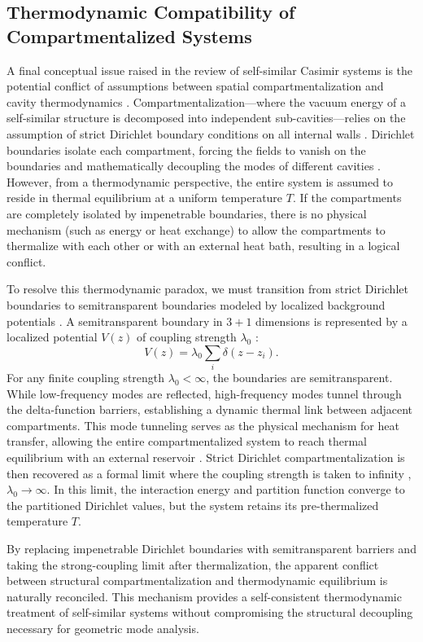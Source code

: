\documentclass[12pt,letterpaper]{article}
\newcommand{\revision}[1]{#1}
\begin{document}
\subsection{Thermodynamic Compatibility of Compartmentalized Systems}

\revision{A final conceptual issue raised in the review of self-similar Casimir systems is the potential conflict of assumptions between spatial compartmentalization and cavity thermodynamics \cite{shajesh2017}. Compartmentalization---where the vacuum energy of a self-similar structure is decomposed into independent sub-cavities---relies on the assumption of strict Dirichlet boundary conditions on all internal walls \cite{shajesh2017}. Dirichlet boundaries isolate each compartment, forcing the fields to vanish on the boundaries and mathematically decoupling the modes of different cavities \cite{shajesh2017}. However, from a thermodynamic perspective, the entire system is assumed to reside in thermal equilibrium at a uniform temperature $T$. If the compartments are completely isolated by impenetrable boundaries, there is no physical mechanism (such as energy or heat exchange) to allow the compartments to thermalize with each other or with an external heat bath, resulting in a logical conflict.

To resolve this thermodynamic paradox, we must transition from strict Dirichlet boundaries to semitransparent boundaries modeled by localized background potentials \cite{milton2004delta}. A semitransparent boundary in $3+1$ dimensions is represented by a localized potential $V(z)$ of coupling strength $\lambda_0$ \cite{milton2004delta}:
\begin{equation}
V(z) = \lambda_0 \sum_{i} \delta(z - z_i).
\label{eq:semitransparent_potential}
\end{equation}
For any finite coupling strength $\lambda_0 < \infty$, the boundaries are semitransparent. While low-frequency modes are reflected, high-frequency modes tunnel through the delta-function barriers, establishing a dynamic thermal link between adjacent compartments. This mode tunneling serves as the physical mechanism for heat transfer, allowing the entire compartmentalized system to reach thermal equilibrium with an external reservoir \cite{milton2004delta}. Strict Dirichlet compartmentalization is then recovered as a formal limit where the coupling strength is taken to infinity \cite{milton2004delta}, $\lambda_0 \to \infty.$
In this limit, the interaction energy and partition function converge to the partitioned Dirichlet values, but the system retains its pre-thermalized temperature $T$.

By replacing impenetrable Dirichlet boundaries with semitransparent barriers and taking the strong-coupling limit after thermalization, the apparent conflict between structural compartmentalization and thermodynamic equilibrium is naturally reconciled. This mechanism provides a self-consistent thermodynamic treatment of self-similar systems without compromising the structural decoupling necessary for geometric mode analysis.}
\end{document}

